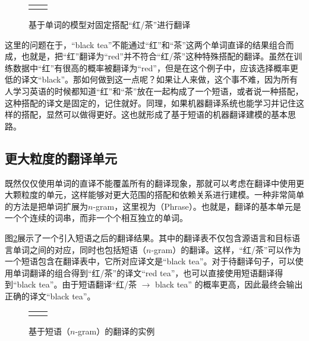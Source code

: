 \begin{figure}[htp]
\centering
\begin{tabular}{l r}
\subfigure{} & \subfigure{}
\end{tabular}
\caption{基于单词的模型对固定搭配“红/茶”进行翻译}
\label{fig:7-2}
\end{figure}

\parinterval 这里的问题在于，“black tea”不能通过“红”和“茶”这两个单词直译的结果组合而成，也就是，把“红”翻译为“red”并不符合“红/茶”这种特殊搭配的翻译。虽然在训练数据中“红”有很高的概率被翻译为“red”，但是在这个例子中，应该选择概率更低的译文“black”。那如何做到这一点呢？如果让人来做，这个事不难，因为所有人学习英语的时候都知道“红”和“茶”放在一起构成了一个短语，或者说一种搭配，这种搭配的译文是固定的，记住就好。同理，如果机器翻译系统也能学习并记住这样的搭配，显然可以做得更好。这也就形成了基于短语的机器翻译建模的基本思路。


\subsection{更大粒度的翻译单元}

\parinterval 既然仅仅使用单词的直译不能覆盖所有的翻译现象，那就可以考虑在翻译中使用更大颗粒度的单元，这样能够对更大范围的搭配和依赖关系进行建模。一种非常简单的方法是把单词扩展为$n$-gram，这里视为{\small{}}（Phrase）。也就是，翻译的基本单元是一个个连续的词串，而非一个个相互独立的单词。

\parinterval 图\ref{fig:7-3}展示了一个引入短语之后的翻译结果。其中的翻译表不仅包含源语言和目标语言单词之间的对应，同时也包括短语（$n$-gram）的翻译。这样，“红/茶”可以作为一个短语包含在翻译表中，它所对应译文是“black tea”。对于待翻译句子，可以使用单词翻译的组合得到“红/茶”的译文“red tea”，也可以直接使用短语翻译得到“black tea”。由于短语翻译“红/茶 $\to$ black tea” 的概率更高，因此最终会输出正确的译文“black tea”。

\begin{figure}[htp]
\centering
\begin{tabular}{l r}
\subfigure{} & \subfigure{} \\
\end{tabular}
\caption{基于短语（$n$-gram）的翻译的实例}
\label{fig:7-3}
\end{figure}


